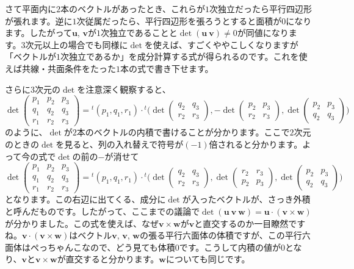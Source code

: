さて平面内に$2$本のベクトルがあったとき、これらが$1$次独立だったら平行四辺形が張れます。逆に$1$次従属だったら、平行四辺形を張ろうとすると面積が$0$になります。したがって$\bm{u}$, $\bm{v}$が$1$次独立であることと$\det( \bm{u} \ \bm{v} ) \neq 0$が同値になります。$3$次元以上の場合でも同様に$\det$を使えば、すごくややこしくなりますが「ベクトルが$1$次独立であるか」を成分計算する式が得られるのです。これを使えば共線・共面条件をたった$1$本の式で書き下せます。

さらに$3$次元の$\det$を注意深く観察すると、
\[
\det
\begin{pmatrix}
p_1 & p_2 & p_3 \\
q_1 & q_2 & q_3 \\
r_1 & r_2 & r_3
\end{pmatrix}
=
{}^t(p_1, q_1, r_1)
\cdot
{}^t
\Biggl(
\det
\begin{pmatrix}
q_2 & q_3 \\
r_2 & r_3
\end{pmatrix}
, 
-
\det
\begin{pmatrix}
p_2 & p_3 \\
r_2 & r_3
\end{pmatrix}
, 
\det
\begin{pmatrix}
p_2 & p_3 \\
q_2 & q_3
\end{pmatrix}
\Biggr)
\]
のように、$\det$が$2$本のベクトルの内積で書けることが分かります。ここで$2$次元のときの$\det$を見ると、列の入れ替えで符号が$(-1)$倍されると分かります。よって今の式で$\det$の前の$-$が消せて
\[
\det
\begin{pmatrix}
p_1 & p_2 & p_3 \\
q_1 & q_2 & q_3 \\
r_1 & r_2 & r_3
\end{pmatrix}
=
{}^t(p_1, q_1, r_1)
\cdot
{}^t
\Biggl(
\det
\begin{pmatrix}
q_2 & q_3 \\
r_2 & r_3
\end{pmatrix}
, 
\det
\begin{pmatrix}
r_2 & r_3 \\
p_2 & p_3
\end{pmatrix}
, 
\det
\begin{pmatrix}
p_2 & p_3 \\
q_2 & q_3
\end{pmatrix}
\Biggr)
\]
となります。この右辺に出てくる、成分に$\det$が入ったベクトルが、さっき外積と呼んだものです。したがって、ここまでの議論で$\det(\bm{u}\ \bm{v}\ \bm{w}) = \bm{u}\cdot(\bm{v}\times\bm{w})$が分かりました。この式を使えば、なぜ$\bm{v}\times\bm{w}$が$\bm{v}$と直交するのか一目瞭然ですね。$\bm{v}\cdot(\bm{v}\times\bm{w})$はベクトル$\bm{v}$, $\bm{v}$, $\bm{w}$の張る平行六面体の体積ですが、この平行六面体はぺっちゃんこなので、どう見ても体積$0$です。こうして内積の値が$0$となり、$\bm{v}$と$\bm{v}\times\bm{w}$が直交すると分かります。$\bm{w}$についても同じです。

